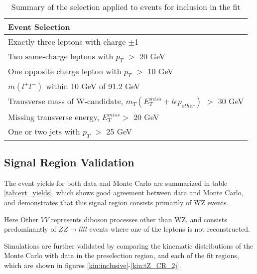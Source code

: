 \begin{table}[h]
    \centering
    \begin{tabular}{l}
        \hline\hline
        Event Selection\\
        \hline 
        Exactly three leptons with charge $\pm$1 \\
        Two same-charge leptons with $p_T$ $>$ 20 GeV \\
        One opposite charge lepton with $p_T$ $>$ 10 GeV \\
        $m(l^+l^-)$ within 10 GeV of 91.2 GeV \\
        Transverse mass of W-candidate, $m_T(E_T^{miss} + lep_{other})$ $>$ 30 GeV \\
        Missing transverse energy, $E_T^{miss} >$ 20 GeV \\
        One or two jets with $p_T$ $>$ 25 GeV \\
        \hline\hline
    \end{tabular}
    \caption{Summary of the selection applied to events for inclusion in the fit}
    \label{tbl:selection}
\end{table}

\subsection{Signal Region Validation}
\label{sec:SRkinematics}

The event yields for both data and Monte Carlo are summarized in table \ref{tab:evt_yields}, which shows good agreement between data and Monte Carlo, and demonstrates that this signal region consists primarily of WZ events.

\begin{table}[H]
    \centering
        
    \label{tab:evt_yields}
\end{table}

Here Other $VV$ represents diboson processes other than WZ, and consists predominantly of $ZZ\rightarrow llll$ events where one of the leptons is not reconstructed.

Simulations are further validated by comparing the kinematic distributions of the Monte Carlo with data in the preselection region, and each of the fit regions, which are shown in figures \ref{kin:inclusive}-\ref{kin:tZ_CR_2j}.

